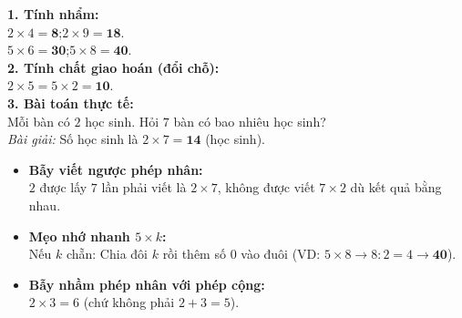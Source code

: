 \documentclass[12pt,a4paper]{article}
\begin{document}
\vspace{-2.5mm}
\noindent
\begin{minipage}[t]{0.49\textwidth}\vspace{0pt}
\begin{tcolorbox}[
  enhanced,
  colback=green!4!white,
  colframe=green!60!black,
  arc=2mm, boxrule=0.8pt,
  left=2mm, right=2mm, top=1.8mm, bottom=1.8mm,
  title={\footnotesize\bfseries\color{white}\faCheckCircle\ Ví dụ thực hành chuẩn mực}
]
{\footnotesize
\textbf{1. Tính nhẩm:}\\
$2 \times 4 = \mathbf{8}$;\quad $2 \times 9 = \mathbf{18}$.\\
$5 \times 6 = \mathbf{30}$;\quad $5 \times 8 = \mathbf{40}$.\\
\textbf{2. Tính chất giao hoán (đổi chỗ):}\\
$2 \times 5 = 5 \times 2 = \mathbf{10}$.\\
\textbf{3. Bài toán thực tế:}\\
Mỗi bàn có $2$ học sinh. Hỏi $7$ bàn có bao nhiêu học sinh?\\
\textit{Bài giải:} Số học sinh là $2 \times 7 = \mathbf{14}$ (học sinh).
}
\end{tcolorbox}
\end{minipage}
\hfill
\begin{minipage}[t]{0.49\textwidth}\vspace{0pt}
\begin{tcolorbox}[
  enhanced,
  colback=red!4!white,
  colframe=red!70!black,
  arc=2mm, boxrule=0.8pt,
  left=2mm, right=2mm, top=1.8mm, bottom=1.8mm,
  title={\footnotesize\bfseries\color{white}\faExclamationTriangle\ Mẹo tránh bẫy trắc nghiệm}
]
{\footnotesize
\begin{itemize}\setlength{\itemsep}{1.5pt}\setlength{\leftskip}{-2.5mm}
  \item \textbf{Bẫy viết ngược phép nhân:}\\
  $2$ được lấy $7$ lần phải viết là $2 \times 7$, không được viết $7 \times 2$ dù kết quả bằng nhau.
  \item \textbf{Mẹo nhớ nhanh $5 \times k$:}\\
  Nếu $k$ chẵn: Chia đôi $k$ rồi thêm số $0$ vào đuôi (VD: $5 \times 8 \to 8:2=4 \to \mathbf{40}$).
  \item \textbf{Bẫy nhầm phép nhân với phép cộng:}\\
  $2 \times 3 = 6$ (chứ không phải $2 + 3 = 5$).
\end{itemize}
}
\end{tcolorbox}
\end{minipage}
\end{document}
